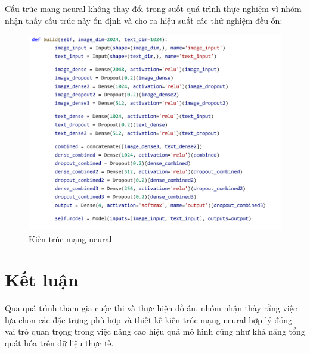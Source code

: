 \documentclass[11pt]{article}
\begin{document}
\vspace*{-3mm}
Cấu trúc mạng neural không thay đổi trong suốt quá trình thực nghiệm vì nhóm nhận thấy cấu trúc này ổn định và cho ra hiệu suất các thử nghiệm đều ổn:
\vspace*{-1mm}
\begin{figure}[h]
\centering
\includegraphics[width=1.0\linewidth]{Picture5.png}
\caption{Kiến trúc mạng neural}
\label{fig:archi}
\end{figure}


\section{Kết luận}
\hspace*{5mm}Qua quá trình tham gia cuộc thi và thực hiện đồ án, nhóm nhận thấy rằng việc lựa chọn các đặc trưng phù hợp và thiết kế kiến trúc mạng neural hợp lý đóng vai trò quan trọng trong việc nâng cao hiệu quả mô hình cũng như khả năng tổng quát hóa trên dữ liệu thực tế.
\end{document}
